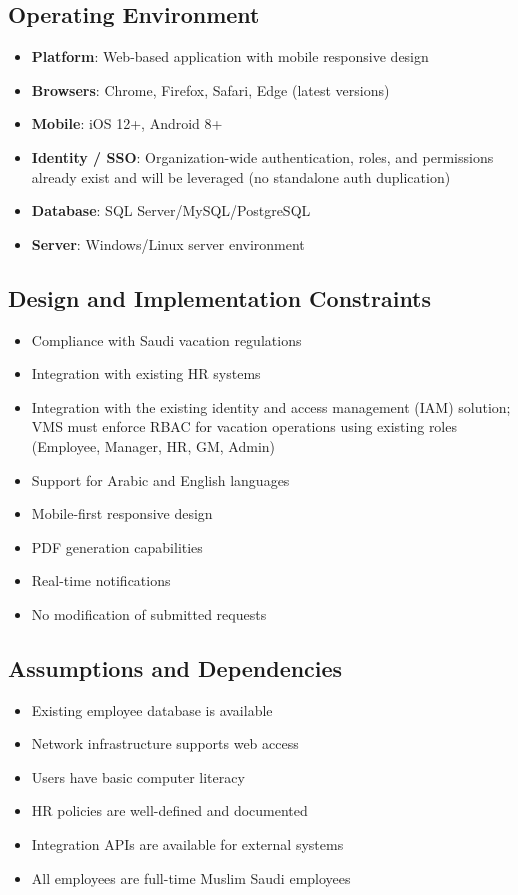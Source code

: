\documentclass[12pt,a4paper]{article}
\begin{document}
\subsection{Operating Environment}
\begin{itemize}
    \item \textbf{Platform}: Web-based application with mobile responsive design
    \item \textbf{Browsers}: Chrome, Firefox, Safari, Edge (latest versions)
    \item \textbf{Mobile}: iOS 12+, Android 8+
    \item \textbf{Identity / SSO}: Organization-wide authentication, roles, and permissions already exist and will be leveraged (no standalone auth duplication)
    \item \textbf{Database}: SQL Server/MySQL/PostgreSQL
    \item \textbf{Server}: Windows/Linux server environment
\end{itemize}

\subsection{Design and Implementation Constraints}
\begin{itemize}
    \item Compliance with Saudi vacation regulations
    \item Integration with existing HR systems
    \item Integration with the existing identity and access management (IAM) solution; VMS must enforce RBAC for vacation operations using existing roles (Employee, Manager, HR, GM, Admin)
    \item Support for Arabic and English languages
    \item Mobile-first responsive design
    \item PDF generation capabilities
    \item Real-time notifications
    \item No modification of submitted requests
\end{itemize}

\subsection{Assumptions and Dependencies}
\begin{itemize}
    \item Existing employee database is available
    \item Network infrastructure supports web access
    \item Users have basic computer literacy
    \item HR policies are well-defined and documented
    \item Integration APIs are available for external systems
    \item All employees are full-time Muslim Saudi employees
\end{itemize}
\end{document}

